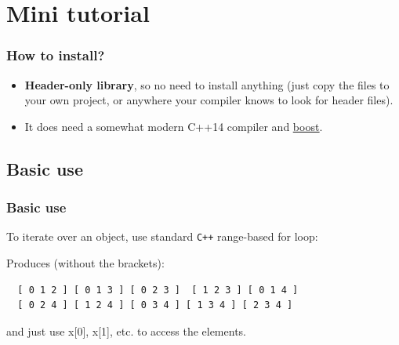 \documentclass[spanish,professionalfonts]{beamer}
\def\tcb#1{\textcolor{MyBlue}{#1}}
\begin{document}
\section{Mini tutorial}

\begin{frame}\frametitle{How to install?}
 \begin{itemize}
  \item \textbf{Header-only library}, so no need to install anything (just copy the files to your own project, or anywhere your compiler knows to look for header files).
  \item It does need a somewhat modern C++14 compiler and \href{http://www.boost.org}{\tcb{\underline{boost}}}.
 \end{itemize}
\end{frame}


\subsection{Basic use}


\begin{frame}[fragile]\frametitle{Basic use}
To iterate over an object, use standard \texttt{C++} range-based for loop: \pause

 \combsencillo
 
 \pause
 Produces (without the brackets):
  \begin{verbatim} 
  [ 0 1 2 ] [ 0 1 3 ] [ 0 2 3 ]  [ 1 2 3 ] [ 0 1 4 ] 
  [ 0 2 4 ] [ 1 2 4 ] [ 0 3 4 ] [ 1 3 4 ] [ 2 3 4 ] 
  \end{verbatim}

  and just use x[0], x[1], etc. to access the elements.
\end{frame}

\end{document}
